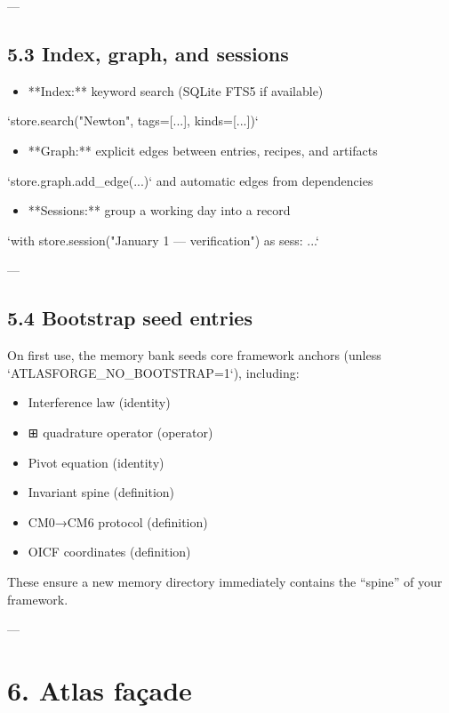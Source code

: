 \documentclass[11pt]{article}
\begin{document}
---

\subsection{5.3 Index, graph, and sessions}

\begin{itemize}
\item **Index:** keyword search (SQLite FTS5 if available)
\end{itemize}
  `store.search("Newton", tags=[...], kinds=[...])`

\begin{itemize}
\item **Graph:** explicit edges between entries, recipes, and artifacts
\end{itemize}
  `store.graph.add\_edge(...)` and automatic edges from dependencies

\begin{itemize}
\item **Sessions:** group a working day into a record
\end{itemize}
  `with store.session("January 1 — verification") as sess: ...`

---

\subsection{5.4 Bootstrap seed entries}

On first use, the memory bank seeds core framework anchors (unless `ATLASFORGE\_NO\_BOOTSTRAP=1`), including:

\begin{itemize}
\item Interference law (identity)
\item ⊞ quadrature operator (operator)
\item Pivot equation (identity)
\item Invariant spine (definition)
\item CM0→CM6 protocol (definition)
\item OICF coordinates (definition)
\end{itemize}

These ensure a new memory directory immediately contains the “spine” of your framework.

---

\section{6. Atlas façade}
\end{document}
